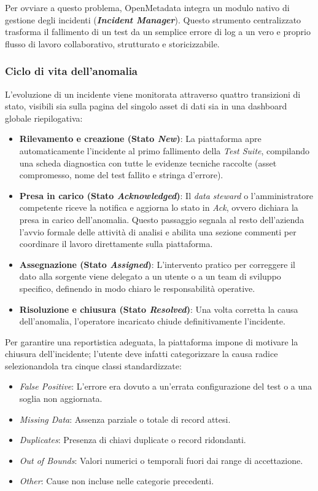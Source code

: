 Per ovviare a questo problema, OpenMetadata integra un modulo nativo di gestione degli incidenti (\textbf{\emph{Incident Manager}}). Questo strumento centralizzato trasforma 
il fallimento di un test da un semplice errore di log a un vero e proprio flusso di lavoro collaborativo, strutturato e storicizzabile.

\subsubsection{Ciclo di vita dell'anomalia}
L'evoluzione di un incidente viene monitorata attraverso quattro transizioni di stato, visibili sia sulla pagina del singolo asset di dati sia in una dashboard globale riepilogativa:
\begin{itemize}
    \item \textbf{Rilevamento e creazione (Stato \emph{New})}: La piattaforma apre automaticamente l'incidente al primo fallimento della \emph{Test Suite}, compilando una scheda diagnostica con tutte le evidenze tecniche raccolte (asset compromesso, nome del test fallito e stringa d'errore).
    \item \textbf{Presa in carico (Stato \emph{Acknowledged})}: Il \emph{data steward} o l'amministratore competente riceve la notifica e aggiorna lo stato in \emph{Ack}, ovvero dichiara la presa in carico dell'anomalia. Questo passaggio segnala al resto dell'azienda l'avvio formale delle attività di analisi e abilita una sezione commenti per coordinare il lavoro direttamente sulla piattaforma.
    \item \textbf{Assegnazione (Stato \emph{Assigned})}: L'intervento pratico per correggere il dato alla sorgente viene delegato a un utente o a un team di sviluppo specifico, definendo in modo chiaro le responsabilità operative.
    \item \textbf{Risoluzione e chiusura (Stato \emph{Resolved})}: Una volta corretta la causa dell'anomalia, l'operatore incaricato chiude definitivamente l'incidente.
\end{itemize}

Per garantire una reportistica adeguata, la piattaforma impone di motivare la chiusura dell'incidente; l'utente deve infatti categorizzare la causa radice selezionandola 
tra cinque classi standardizzate:
\begin{itemize}
    \item \emph{False Positive}: L'errore era dovuto a un'errata configurazione del test o a una soglia non aggiornata.
    \item \emph{Missing Data}: Assenza parziale o totale di record attesi.
    \item \emph{Duplicates}: Presenza di chiavi duplicate o record ridondanti.
    \item \emph{Out of Bounds}: Valori numerici o temporali fuori dai range di accettazione.
    \item \emph{Other}: Cause non incluse nelle categorie precedenti.
\end{itemize}

